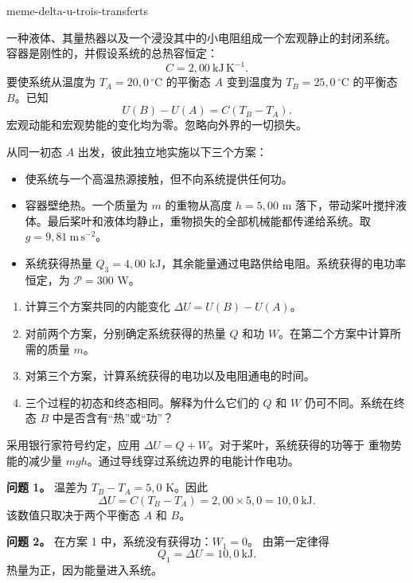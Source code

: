 \begin{exo}{meme-delta-u-trois-transferts}

一种液体、其量热器以及一个浸没其中的小电阻组成一个宏观静止的封闭系统。
容器是刚性的，并假设系统的总热容恒定：
\[
C=2{,}00\ \mathrm{kJ\,K^{-1}}.
\]
要使系统从温度为 $T_A=20{,}0\,^\circ\mathrm{C}$ 的平衡态 $A$
变到温度为 $T_B=25{,}0\,^\circ\mathrm{C}$ 的平衡态 $B$。已知
\[
U(B)-U(A)=C(T_B-T_A).
\]
宏观动能和宏观势能的变化均为零。忽略向外界的一切损失。

从同一初态 $A$ 出发，彼此独立地实施以下三个方案：
\begin{itemize}
\item[方案 1] 使系统与一个高温热源接触，但不向系统提供任何功。
\item[方案 2] 容器壁绝热。一个质量为 $m$ 的重物从高度 $h=5{,}00$ m 落下，带动桨叶搅拌液体。最后桨叶和液体均静止，重物损失的全部机械能都传递给系统。取 $g=9{,}81\ \mathrm{m\,s^{-2}}$。
\item[方案 3] 系统获得热量 $Q_3=4{,}00$ kJ，其余能量通过电路供给电阻。系统获得的电功率恒定，为 $\mathcal P=300$ W。
\end{itemize}

\begin{enumerate}
\item 计算三个方案共同的内能变化 $\Delta U=U(B)-U(A)$。
\item 对前两个方案，分别确定系统获得的热量 $Q$ 和功 $W$。在第二个方案中计算所需的质量 $m$。
\item 对第三个方案，计算系统获得的电功以及电阻通电的时间。
\item 三个过程的初态和终态相同。解释为什么它们的 $Q$ 和 $W$ 仍可不同。系统在终态 $B$ 中是否含有“热”或“功”？
\end{enumerate}

\begin{indication}
采用银行家符号约定，应用 $\Delta U=Q+W$。对于桨叶，系统获得的功等于
重物势能的减少量 $mgh$。通过导线穿过系统边界的电能计作电功。
\end{indication}

\begin{solution}
\textbf{问题 1。} 温差为 $T_B-T_A=5{,}0$ K。因此
\[
\Delta U=C(T_B-T_A)
=2{,}00\times5{,}0
=10{,}0\ \mathrm{kJ}.
\]
该数值只取决于两个平衡态 $A$ 和 $B$。

\textbf{问题 2。} 在方案 1 中，系统没有获得功：$W_1=0$。
由第一定律得
\[
Q_1=\Delta U=10{,}0\ \mathrm{kJ}.
\]
热量为正，因为能量进入系统。


\end{solution}
\end{exo}
